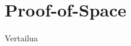\section{Proof-of-Space\label{spacemint}}
\begin{otherlanguage}{english}

Vertailua

\end{otherlanguage}